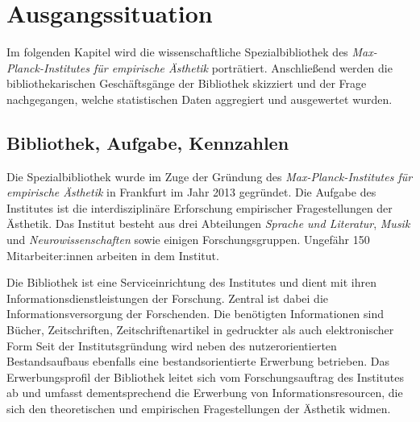 \chapter{Ausgangssituation}

Im folgenden Kapitel wird die wissenschaftliche Spezialbibliothek des \textit{Max-Planck-Institutes für empirische Ästhetik} porträtiert. 
Anschließend werden die bibliothekarischen Geschäftsgänge der
Bibliothek skizziert und der Frage nachgegangen, welche statistischen Daten aggregiert und ausgewertet wurden. 

\section{Bibliothek, Aufgabe, Kennzahlen}


Die Spezialbibliothek wurde im Zuge der Gründung des \textit{Max-Planck-Institutes für empirische Ästhetik} in Frankfurt im Jahr 2013 gegründet.
Die Aufgabe des Institutes ist die interdisziplinäre Erforschung empirischer Fragestellungen der Ästhetik. Das Institut besteht aus drei Abteilungen 
\textit{Sprache und Literatur}, \textit{Musik} und \textit{Neurowissenschaften} sowie einigen Forschungsgruppen. Ungefähr 150 Mitarbeiter:innen arbeiten 
in dem Institut. 

Die Bibliothek ist eine Serviceinrichtung des Institutes und dient mit ihren Informationsdienstleistungen der Forschung.
Zentral ist dabei die Informationsversorgung der Forschenden.
Die benötigten Informationen sind Bücher, Zeitschriften, Zeitschriftenartikel in gedruckter als auch elektronischer Form
Seit der Institutsgründung wird neben des nutzerorientierten Bestandsaufbaus ebenfalls eine bestandsorientierte Erwerbung betrieben.
Das Erwerbungsprofil der Bibliothek leitet sich vom Forschungsauftrag des Institutes ab und umfasst dementsprechend die Erwerbung von Informationsresourcen, die sich den theoretischen und empirischen Fragestellungen der Ästhetik widmen.

